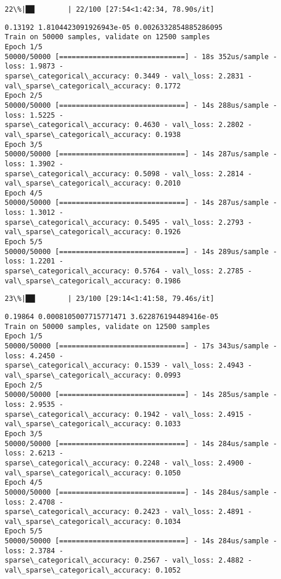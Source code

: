 \documentclass[11pt]{article}
\begin{document}
    \begin{Verbatim}[commandchars=\\\{\}]
 22\%|██▏       | 22/100 [27:54<1:42:34, 78.90s/it]
    \end{Verbatim}

    \begin{Verbatim}[commandchars=\\\{\}]
0.13192 1.8104423091926943e-05 0.0026332854885286095
Train on 50000 samples, validate on 12500 samples
Epoch 1/5
50000/50000 [==============================] - 18s 352us/sample - loss: 1.9873 -
sparse\_categorical\_accuracy: 0.3449 - val\_loss: 2.2831 -
val\_sparse\_categorical\_accuracy: 0.1772
Epoch 2/5
50000/50000 [==============================] - 14s 288us/sample - loss: 1.5225 -
sparse\_categorical\_accuracy: 0.4630 - val\_loss: 2.2802 -
val\_sparse\_categorical\_accuracy: 0.1938
Epoch 3/5
50000/50000 [==============================] - 14s 287us/sample - loss: 1.3902 -
sparse\_categorical\_accuracy: 0.5098 - val\_loss: 2.2814 -
val\_sparse\_categorical\_accuracy: 0.2010
Epoch 4/5
50000/50000 [==============================] - 14s 287us/sample - loss: 1.3012 -
sparse\_categorical\_accuracy: 0.5495 - val\_loss: 2.2793 -
val\_sparse\_categorical\_accuracy: 0.1926
Epoch 5/5
50000/50000 [==============================] - 14s 289us/sample - loss: 1.2201 -
sparse\_categorical\_accuracy: 0.5764 - val\_loss: 2.2785 -
val\_sparse\_categorical\_accuracy: 0.1986
    \end{Verbatim}

    \begin{Verbatim}[commandchars=\\\{\}]
 23\%|██▎       | 23/100 [29:14<1:41:58, 79.46s/it]
    \end{Verbatim}

    \begin{Verbatim}[commandchars=\\\{\}]
0.19864 0.0008105007715771471 3.622876194489416e-05
Train on 50000 samples, validate on 12500 samples
Epoch 1/5
50000/50000 [==============================] - 17s 343us/sample - loss: 4.2450 -
sparse\_categorical\_accuracy: 0.1539 - val\_loss: 2.4943 -
val\_sparse\_categorical\_accuracy: 0.0993
Epoch 2/5
50000/50000 [==============================] - 14s 285us/sample - loss: 2.9535 -
sparse\_categorical\_accuracy: 0.1942 - val\_loss: 2.4915 -
val\_sparse\_categorical\_accuracy: 0.1033
Epoch 3/5
50000/50000 [==============================] - 14s 284us/sample - loss: 2.6213 -
sparse\_categorical\_accuracy: 0.2248 - val\_loss: 2.4900 -
val\_sparse\_categorical\_accuracy: 0.1050
Epoch 4/5
50000/50000 [==============================] - 14s 284us/sample - loss: 2.4708 -
sparse\_categorical\_accuracy: 0.2423 - val\_loss: 2.4891 -
val\_sparse\_categorical\_accuracy: 0.1034
Epoch 5/5
50000/50000 [==============================] - 14s 284us/sample - loss: 2.3784 -
sparse\_categorical\_accuracy: 0.2567 - val\_loss: 2.4882 -
val\_sparse\_categorical\_accuracy: 0.1052
    \end{Verbatim}
\end{document}
